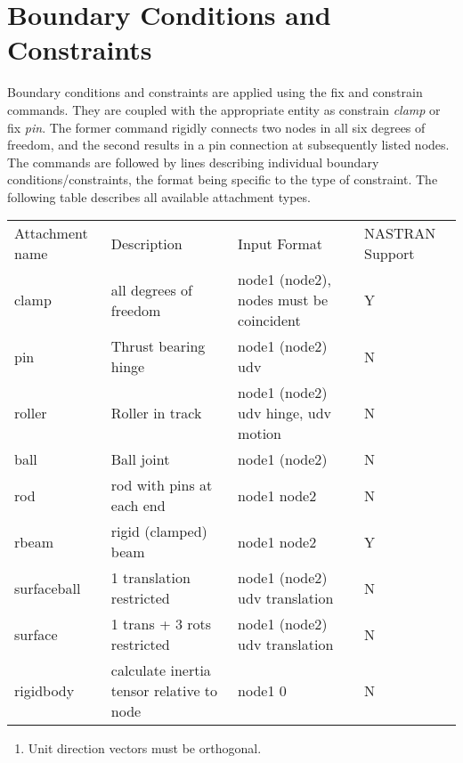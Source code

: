 \documentclass[12pt]{article}
\newcommand*{\sarg}[1]{\textit{#1}}
\newcommand*{\command}[1]{\textsf{#1}}
\begin{document}
\section{Boundary Conditions and Constraints}\label{sec:bcnconstr}
Boundary conditions and constraints are applied using the
\command{fix} and \command{constrain} commands. They are coupled with
the appropriate entity as \command{constrain} \sarg{clamp} or
\command{fix} \sarg{pin}. The former command rigidly connects two
nodes in all six degrees of freedom, and the second results in a pin
connection at subsequently listed nodes. The commands are followed by
lines describing individual boundary conditions/constraints, the
format being specific to the type of constraint. The following table
describes all available attachment types.



\begin{center}
{\small \begin{tabular}{|p{}|p{1.5in}|p{1.5in}|p{.75in}|}
  \hline
  Attachment name&Description &Input Format&NASTRAN Support\\
  \hhline{|====|} clamp & all degrees of freedom & node1 (node2), nodes must be coincident&Y\\
  \hline pin & Thrust bearing hinge & node1 (node2) udv &N\\
  \hline roller & Roller in track& node1 (node2) udv hinge, udv motion&N\\
  \hline ball & Ball joint & node1 (node2)&N\\
  \hline rod & rod with pins at each end& node1 node2&N\\
  \hline rbeam &rigid (clamped) beam & node1 node2&Y\\
  \hline surfaceball & 1 translation restricted & node1 (node2) udv translation&N\\
  \hline surface & 1 trans + 3 rots restricted & node1 (node2) udv translation&N\\
  \hline rigidbody& calculate inertia tensor relative to node& node1 0&N\\
\hline
\end{tabular}
}%
\begin{enumerate}
\item {Unit direction vectors must be orthogonal.}
\end{enumerate}


\end{center}
\end{document}
